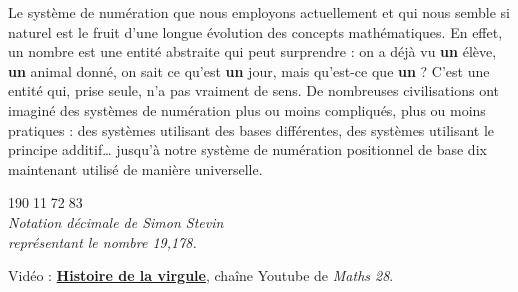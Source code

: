 \vspace*{-2mm}

\begin{debat}
    Le système de numération que nous employons actuellement et qui nous semble si naturel est le fruit d'une longue évolution des concepts mathématiques. En effet, un nombre est une entité abstraite qui peut surprendre : on a déjà vu {\bf un} élève, {\bf un} animal donné, on sait ce qu'est {\bf un} jour, mais qu'est-ce que {\bf un} ? C'est une entité qui, prise seule, n'a pas vraiment de sens. De nombreuses civilisations ont imaginé des systèmes de numération plus ou moins compliqués, plus ou moins pratiques : des systèmes utilisant des bases différentes, des systèmes utilisant le principe additif\dots{} jusqu'à notre système de numération positionnel de base dix maintenant utilisé de manière universelle. \\
    \begin{center}
       \textcolor{B1}{{\huge 19\textcircled{\Large 0}1\textcircled{\Large 1}7\textcircled{\Large2}8\textcircled{\Large 3}} \\ [3mm]
       \it Notation décimale de Simon Stevin \\
       représentant le nombre 19,178.}
    \end{center}
    \bigskip
    \begin{cadre}[B2][F4]
       \begin{center}
          Vidéo : \href{https://www.yout-ube.com/watch?v=bkGMa1EJkSA}{\bf Histoire de la virgule}, chaîne Youtube de {\it Maths 28}.
       \end{center}
    \end{cadre}
 \end{debat}